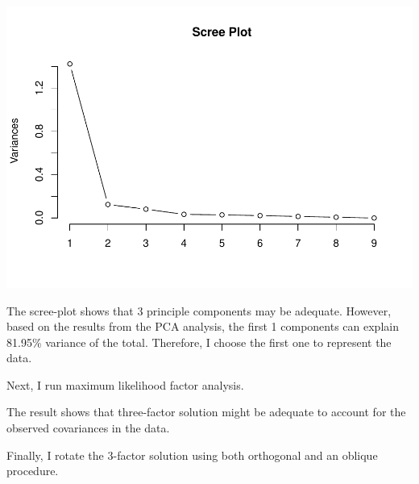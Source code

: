 \documentclass[
]{article}
\newenvironment{Shaded}{\begin{snugshade}}{\end{snugshade}}
\newcommand{\AttributeTok}[1]{\textcolor[rgb]{0.77,0.63,0.00}{#1}}
\newcommand{\CommentTok}[1]{\textcolor[rgb]{0.56,0.35,0.01}{\textit{#1}}}
\newcommand{\ControlFlowTok}[1]{\textcolor[rgb]{0.13,0.29,0.53}{\textbf{#1}}}
\newcommand{\DecValTok}[1]{\textcolor[rgb]{0.00,0.00,0.81}{#1}}
\newcommand{\ErrorTok}[1]{\textcolor[rgb]{0.64,0.00,0.00}{\textbf{#1}}}
\newcommand{\FloatTok}[1]{\textcolor[rgb]{0.00,0.00,0.81}{#1}}
\newcommand{\FunctionTok}[1]{\textcolor[rgb]{0.00,0.00,0.00}{#1}}
\newcommand{\NormalTok}[1]{#1}
\newcommand{\SpecialCharTok}[1]{\textcolor[rgb]{0.00,0.00,0.00}{#1}}
\newcommand{\StringTok}[1]{\textcolor[rgb]{0.31,0.60,0.02}{#1}}
\begin{document}
\includegraphics[width=0.5\linewidth,height=0.75\textheight]{HUDM6122-Homework_05-Chenguang-Pan_files/figure-latex/unnamed-chunk-14-1}

The scree-plot shows that 3 principle components may be adequate.
However, based on the results from the PCA analysis, the first 1
components can explain 81.95\% variance of the total. Therefore, I
choose the first one to represent the data.

Next, I run maximum likelihood factor analysis.

\begin{Shaded}
\end{Shaded}

The result shows that three-factor solution might be adequate to account
for the observed covariances in the data.

Finally, I rotate the 3-factor solution using both orthogonal and an
oblique procedure.
\end{document}
